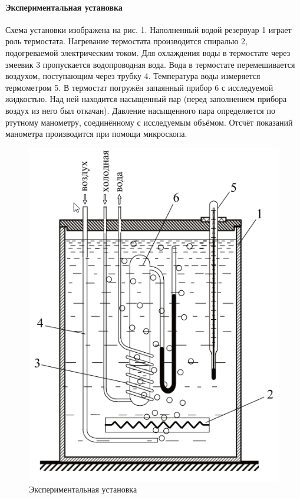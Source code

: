 \documentclass[a4paper,12pt]{article}
\begin{document}
\paragraph{Экспериментальная установка\\}
Схема
установки изображена на рис. 1. Наполненный водой резервуар 1 играет роль термостата. Нагревание термостата производится
спиралью 2, подогреваемой электрическим
током. Для охлаждения воды в термостате через змеевик 3 пропускается водопроводная вода. Вода в термостате перемешивается воздухом, поступающим через трубку 4. Температура воды измеряется термометром 5. В термостат погружён запаянный прибор 6 с исследуемой
жидкостью. Над ней находится насыщенный пар (перед заполнением
прибора воздух из него был откачан). Давление насыщенного пара определяется по ртутному манометру, соединённому с исследуемым объёмом. Отсчёт показаний манометра производится при помощи микроскопа.
\begin{figure}[!h]
\centering
\includegraphics[width=0.55\linewidth]{Уст.png}
\caption{Экспериментальная установка}
\label{fig:mpr}
\end{figure}
\end{document}
